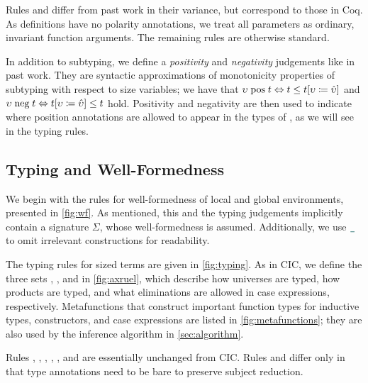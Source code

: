 Rules  and  differ from past work in their variance, but correspond to those in Coq.
As \coinductive definitions have no polarity annotations,
we treat all parameters as ordinary, invariant function arguments.
The remaining rules are otherwise standard.



In addition to subtyping, we define a \textit{positivity} and \textit{negativity} judgements like in past work.
They are syntactic approximations of monotonicity properties of subtyping with respect to size variables;
we have that
$\upsilon \mathrel{\text{pos}} t \Leftrightarrow t \leq t [\upsilon \coloneqq \hat{\upsilon}]$ and
$\upsilon \mathrel{\text{neg}} t \Leftrightarrow t [\upsilon \coloneqq \hat{\upsilon}] \leq t$ hold.
Positivity and negativity are then used to indicate where position annotations are allowed to appear in the types of \cofixpoints,
as we will see in the typing rules.

\subsection{Typing and Well-Formedness}\label{sec:typing:rules}



We begin with the rules for well-formedness of local and global environments, presented in \autoref{fig:wf}.
As mentioned, this and the typing judgements implicitly contain a signature $\Sigma$, whose well-formedness is assumed.
Additionally, we use $\any$ to omit irrelevant constructions for readability.







The typing rules for sized terms are given in \autoref{fig:typing}. As in CIC, we define the three sets \Axioms, \Rules, \citep{PTS} and \Elims in \autoref{fig:axruel}, which describe how universes are typed, how products are typed, and what eliminations are allowed in case expressions, respectively.
Metafunctions that construct important function types for inductive types, constructors, and case expressions are listed in \autoref{fig:metafunctions}; they are also used by the inference algorithm in \autoref{sec:algorithm}.

Rules , , , , , and  are essentially unchanged from CIC.
Rules  and  differ only in that type annotations need to be bare to preserve subject reduction.

